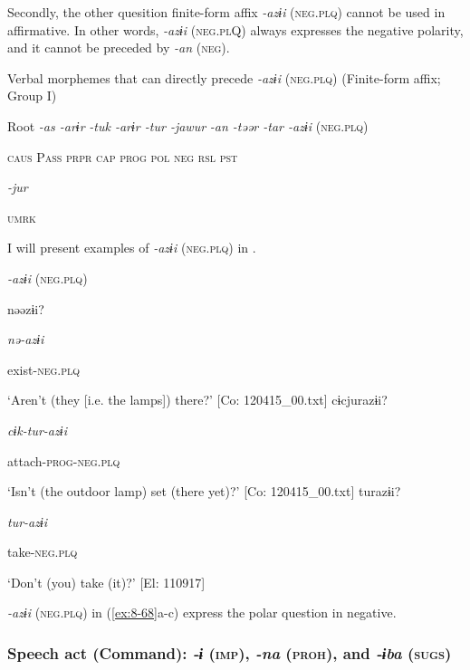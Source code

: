 Secondly, the other quesition finite-form affix \textit{{}-azɨi} (\textsc{neg}.\textsc{plq}) cannot be used in affirmative. In other words, \textit{{}-azɨi} (\textsc{neg}.\textsc{pl}Q) always expresses the negative polarity, and it cannot be preceded by \textit{{}-an} (\textsc{neg}).

\ea\label{ex:8-67}
  Verbal morphemes that can directly precede \textit{-azɨi} (\textsc{neg}.\textsc{plq}) (Finite-form affix; Group I)

  Root  \textit{{}-as  {}-arɨr} %
\textit{{}-tuk  {}-arɨr  {}-tur  {}-jawur} %
\textit{{}-an  {}-təər  {}-tar  {}-azɨi} (\textsc{neg}.\textsc{plq})

    \textsc{caus}  P\textsc{ass}  \textsc{prpr}  \textsc{cap}  \textsc{prog}  \textsc{pol}  \textsc{neg}  \textsc{rsl}  \textsc{pst}

          \textit{{}-jur} 

          \textsc{umrk}

I will present examples of \textit{{}-azɨi} (\textsc{neg}.\textsc{plq}) in .

\ea\label{ex:8-68}
  \textit{{}-azɨi} (\textsc{neg}.\textsc{plq})

\ea {\TM}
\glll  nəəzɨi?

      \textit{nə-azɨi}

      exist-\textsc{neg}.\textsc{plq}

\glt ‘Aren’t (they [i.e. the lamps]) there?’ [Co: 120415\_00.txt]
\ex {\TM}
\glll  cɨcjurazɨi?

      \textit{cɨk-tur-azɨi}

      attach-\textsc{prog}-\textsc{neg}.\textsc{plq}

\glt ‘Isn’t (the outdoor lamp) set (there yet)?’ [Co: 120415\_00.txt]
\ex {\TM}
\glll  turazɨi?

      \textit{tur-azɨi}

      take-\textsc{neg}.\textsc{plq}

\glt ‘Don’t (you) take (it)?’ [El: 110917]

\textit{{}-azɨi} (\textsc{neg}.\textsc{plq}) in (\ref{ex:8-68}a-c) express the polar question in negative.

\subsubsection{Speech act (Command): \textit{{}-ɨ} (\textsc{imp}), \textit{{}-na} (\textsc{proh}), and \textit{{}-ɨba} (\textsc{sugs})}

